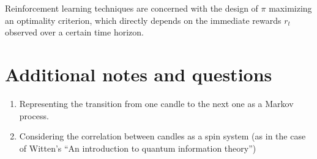 \documentclass[twocolumn,aps,pra,superscriptaddress,nofootinbib,longbibliography]{revtex4-2}
\begin{document}
Reinforcement learning techniques are concerned with the design of \(\pi\) maximizing an optimality criterion, which directly depends on the immediate rewards \(r_t\) observed over a certain time horizon.  


\section{Additional notes and questions}

\begin{enumerate}
    \item Representing the transition from one candle to the next one as a Markov process.
    \item Considering the correlation between candles as a spin system (as in the case of Witten's ``An introduction to quantum information theory'') 
\end{enumerate}


\clearpage



\end{document}
